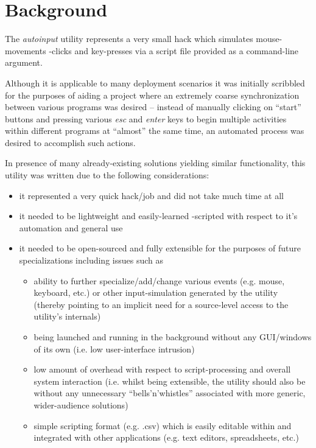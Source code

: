 \documentclass[12pt,a4paper]{article}
\begin{document}
\section{Background}

The \textit{autoinput} utility represents a very small hack which simulates mouse-movements -clicks and key-presses via a script file provided as a command-line argument. 

Although it is applicable to many deployment scenarios it was initially scribbled for the purposes of aiding a project where an extremely coarse synchronization between various programs was desired -- instead of manually clicking on ``start'' buttons and pressing various \textit{esc} and \textit{enter} keys to begin multiple activities within different programs at ``almost'' the same time, an automated process was desired to accomplish such actions.

In presence of many already-existing solutions yielding similar functionality, this utility was written due to the following considerations:
\begin{itemize}
\item it represented a very quick hack/job and did not take much time at all

\item it needed to be lightweight and easily-learned -scripted with respect to it's automation and general use

\item it needed to be open-sourced and fully extensible for the purposes of future specializations including issues such as 
\begin{itemize}
\item ability to further specialize/add/change various events (e.g. mouse, keyboard, etc.) or other input-simulation generated by the utility (thereby pointing to an implicit need for a source-level access to the utility's internals)
\item being launched and running in the background without any GUI/windows of its own (i.e. low user-interface intrusion)
\item low amount of overhead with respect to script-processing and overall system interaction (i.e. whilst being extensible, the utility should also be without any unnecessary ``bells'n'whistles'' associated with more generic, wider-audience solutions)
\item simple scripting format (e.g. .csv) which is easily editable within and integrated with other applications (e.g. text editors, spreadsheets, etc.)
\end{itemize}
\end{itemize}
\end{document}
